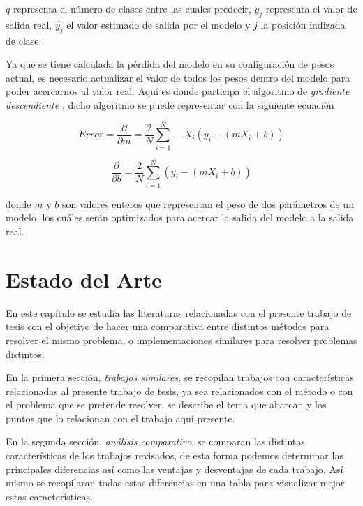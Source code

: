 $q$ representa el número de clases entre las cuales predecir, $y_j$ representa el valor de salida real, $\hat{y_j}$ el valor estimado de salida por el modelo y $j$ la posición indizada de clase.

Ya que se tiene calculada la pérdida del modelo en su configuración de pesos actual, es necesario actualizar el valor de todos los pesos dentro del modelo para poder acercarnos al valor real. Aquí es donde participa el algoritmo de \emph{gradiente descendiente} \citep{alg:gradient}, dicho algoritmo se puede representar con la siguiente ecuación

\begin{equation}
        Error = \frac{\partial}{\partial m} = \frac{2}{N}\sum_{i=1}^{N}-X_i(y_i-(mX_i+b))
\end{equation}

\begin{equation}
        \frac{\partial}{\partial b} = \frac{2}{N}\sum_{i=1}^{N}(y_i-(mX_i+b)) 
\end{equation}

donde $m$ y $b$ son valores enteros que representan el peso de dos parámetros de un modelo, los cuáles serán optimizados para acercar la salida del modelo a la salida real.

%
%           


\chapter{Estado del Arte}
En este capítulo se estudia las literaturas relacionadas con el presente trabajo de tesis con el objetivo de hacer una comparativa entre distintos métodos para resolver el mismo problema, o implementaciones similares para resolver problemas distintos.

En la primera sección, \emph{trabajos similares}, se recopilan trabajos con características relacionadas al presente trabajo de tesis, ya sea relacionados con el método o con el problema que se pretende resolver, se describe el tema que abarcan y los puntos que lo relacionan con el trabajo aquí presente.

En la segunda sección, \emph{análisis comparativo}, se comparan las distintas características de los trabajos revisados, de esta forma podemos determinar las principales diferencias así como las ventajas y desventajas de cada trabajo. Así mismo se recopilaran todas estas diferencias en una tabla para visualizar mejor estas características.

